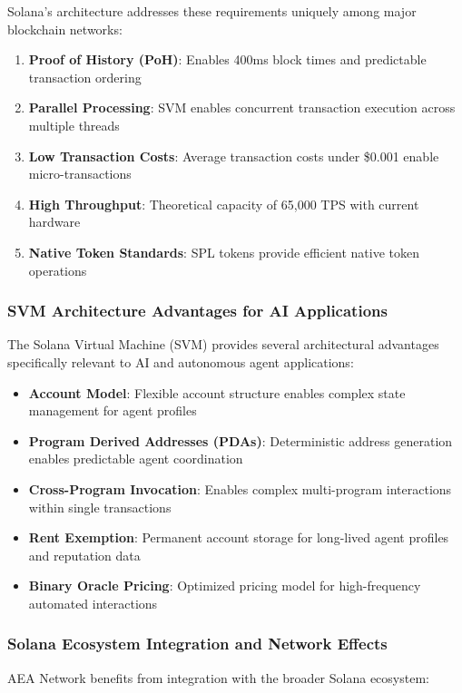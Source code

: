 \documentclass[12pt,a4paper]{article}
\begin{document}
Solana's architecture addresses these requirements uniquely among major blockchain networks:

\begin{enumerate}
\item \textbf{Proof of History (PoH)}: Enables 400ms block times and predictable transaction ordering
\item \textbf{Parallel Processing}: SVM enables concurrent transaction execution across multiple threads
\item \textbf{Low Transaction Costs}: Average transaction costs under \$0.001 enable micro-transactions
\item \textbf{High Throughput}: Theoretical capacity of 65,000 TPS with current hardware
\item \textbf{Native Token Standards}: SPL tokens provide efficient native token operations
\end{enumerate}

\subsubsection{SVM Architecture Advantages for AI Applications}

The Solana Virtual Machine (SVM) provides several architectural advantages specifically relevant to AI and autonomous agent applications:

\begin{itemize}
\item \textbf{Account Model}: Flexible account structure enables complex state management for agent profiles
\item \textbf{Program Derived Addresses (PDAs)}: Deterministic address generation enables predictable agent coordination
\item \textbf{Cross-Program Invocation}: Enables complex multi-program interactions within single transactions
\item \textbf{Rent Exemption}: Permanent account storage for long-lived agent profiles and reputation data
\item \textbf{Binary Oracle Pricing}: Optimized pricing model for high-frequency automated interactions
\end{itemize}

\subsubsection{Solana Ecosystem Integration and Network Effects}

AEA Network benefits from integration with the broader Solana ecosystem:
\end{document}
